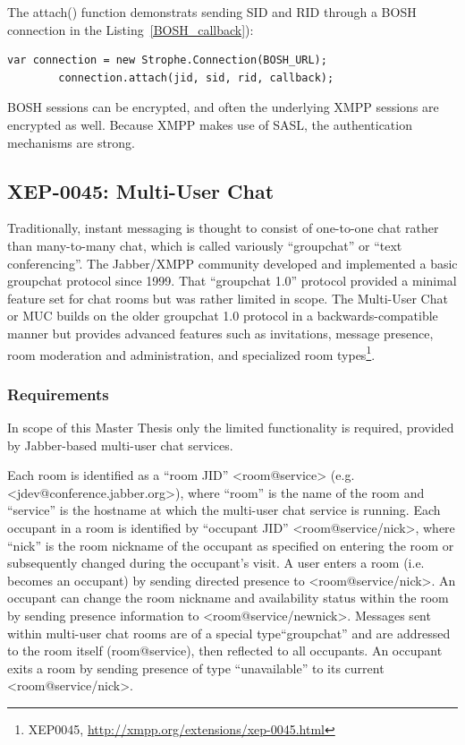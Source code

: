 The attach() function demonstrats sending SID and RID through a BOSH connection in the Listing~\ref{BOSH_callback}):
	    \begin{lstlisting}[label=BOSH_callback,caption=BOSH Callback]
		var connection = new Strophe.Connection(BOSH_URL);
        connection.attach(jid, sid, rid, callback);
	    \end{lstlisting}

BOSH sessions can be encrypted, and often the underlying XMPP sessions are encrypted as well. Because XMPP makes use of SASL, the authentication mechanisms are strong.

\subsection{XEP-0045: Multi-User Chat}
Traditionally, instant messaging is thought to consist of one-to-one chat rather than many-to-many chat, which is called variously ``groupchat'' or ``text conferencing''. The Jabber/XMPP community developed and implemented a basic groupchat protocol since 1999. That ``groupchat 1.0'' protocol provided a minimal feature set for chat rooms but was rather limited in scope. The Multi-User Chat or MUC builds on the older groupchat 1.0 protocol in a backwards-compatible manner but provides advanced features such as invitations, message presence, room moderation and administration, and specialized room types\footnote{XEP0045, \url{http://xmpp.org/extensions/xep-0045.html}}.

\subsubsection{Requirements}
In scope of this Master Thesis only the limited functionality is required, provided by Jabber-based multi-user chat services. 

Each room is identified as a ``room JID'' <room@service> (e.g. <jdev@conference.jabber.org>), where ``room'' is the name of the room and ``service'' is the hostname at which the multi-user chat service is running. Each occupant in a room is identified by ``occupant JID'' <room@service/nick>, where ``nick'' is the room nickname of the occupant as specified on entering the room or subsequently changed during the occupant's visit. A user enters a room (i.e. becomes an occupant) by sending directed presence to <room@service/nick>. An occupant can change the room nickname and availability status within the room by sending presence information to <room@service/newnick>. Messages sent within multi-user chat rooms are of a special type``groupchat'' and are addressed to the room itself (room@service), then reflected to all occupants. An occupant exits a room by sending presence of type ``unavailable'' to its current <room@service/nick>.

